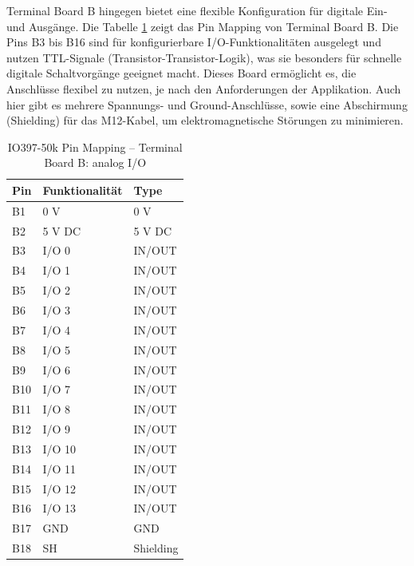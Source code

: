 Terminal Board B hingegen bietet eine flexible Konfiguration für digitale Ein- und Ausgänge. Die Tabelle \ref{IO397_50k:tab:Board_B} zeigt das Pin Mapping von Terminal Board B. Die Pins B3 bis B16 sind für konfigurierbare I/O-Funktionalitäten ausgelegt und nutzen TTL-Signale (Transistor-Transistor-Logik), was sie besonders für schnelle digitale Schaltvorgänge geeignet macht. Dieses Board ermöglicht es, die Anschlüsse flexibel zu nutzen, je nach den Anforderungen der Applikation. Auch hier gibt es mehrere Spannungs- und Ground-Anschlüsse, sowie eine Abschirmung (Shielding) für das M12-Kabel, um elektromagnetische Störungen zu minimieren.


\pagebreak[1]
\begin{table}[!ht]
	\centering
	\caption{IO397-50k Pin Mapping – Terminal Board B: analog I/O \cite[15]{speedgoat:IO397_50k}}
	\label{IO397_50k:tab:Board_B}
	\begin{tabular}{lll}
		\hline
		\textbf{Pin}             & \textbf{Funktionalität} & \textbf{Type} \\ \hline
		\multicolumn{1}{l|}{B1}  & 0 V                     & 0 V           \\
		\multicolumn{1}{l|}{B2}  & 5 V DC                  & 5 V DC        \\ \hline
		\multicolumn{1}{l|}{B3}  & I/O 0                   & IN/OUT        \\
		\multicolumn{1}{l|}{B4}  & I/O 1                   & IN/OUT        \\
		\multicolumn{1}{l|}{B5}  & I/O 2                   & IN/OUT        \\
		\multicolumn{1}{l|}{B6}  & I/O 3                   & IN/OUT        \\
		\multicolumn{1}{l|}{B7}  & I/O 4                   & IN/OUT        \\
		\multicolumn{1}{l|}{B8}  & I/O 5                   & IN/OUT        \\
		\multicolumn{1}{l|}{B9}  & I/O 6                   & IN/OUT        \\
		\multicolumn{1}{l|}{B10} & I/O 7                   & IN/OUT        \\
		\multicolumn{1}{l|}{B11} & I/O 8                   & IN/OUT        \\
		\multicolumn{1}{l|}{B12} & I/O 9                   & IN/OUT        \\
		\multicolumn{1}{l|}{B13} & I/O 10                  & IN/OUT        \\
		\multicolumn{1}{l|}{B14} & I/O 11                  & IN/OUT        \\
		\multicolumn{1}{l|}{B15} & I/O 12                  & IN/OUT        \\
		\multicolumn{1}{l|}{B16} & I/O 13                  & IN/OUT        \\\hline
		\multicolumn{1}{l|}{B17} & GND                     & GND           \\
		\multicolumn{1}{l|}{B18} & SH                      & Shielding     \\ \hline
	\end{tabular}
\end{table}
\pagebreak[4]


